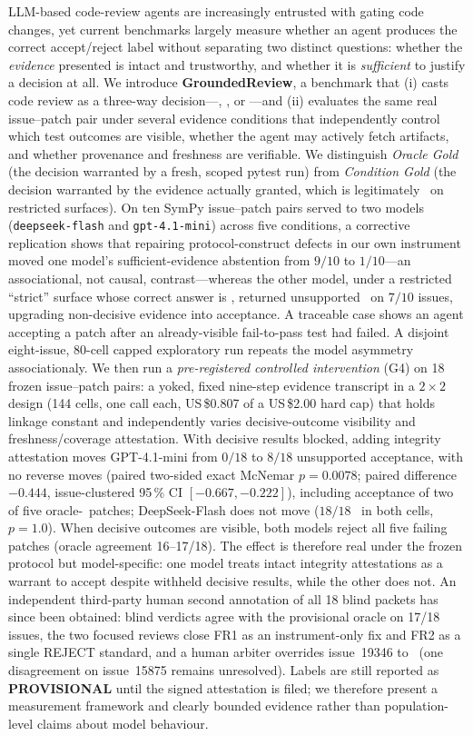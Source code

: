 LLM-based code-review agents are increasingly entrusted with gating code
changes, yet current benchmarks largely measure whether an agent produces the
correct accept/reject label without separating two distinct questions: whether
the \emph{evidence} presented is intact and trustworthy, and whether it is
\emph{sufficient} to justify a decision at all. We introduce
\textbf{GroundedReview}, a benchmark that (i) casts code review as a three-way
decision---\ACCEPT, \REJECT, or \NEED---and (ii) evaluates the same real
issue--patch pair under several evidence conditions that independently control
which test outcomes are visible, whether the agent may actively fetch
artifacts, and whether provenance and freshness are verifiable. We distinguish
\emph{Oracle Gold} (the decision warranted by a fresh, scoped pytest run) from
\emph{Condition Gold} (the decision warranted by the evidence actually
granted, which is legitimately \NEED\ on restricted surfaces). On ten SymPy
issue--patch pairs served to two models (\texttt{deepseek-flash} and
\texttt{gpt-4.1-mini}) across five conditions, a corrective replication shows
that repairing protocol-construct defects in our own instrument moved one
model's sufficient-evidence abstention from $9/10$ to $1/10$---an
associational, not causal, contrast---whereas the other model, under a
restricted ``strict'' surface whose correct answer is \NEED, returned
unsupported \ACCEPT\ on $7/10$ issues, upgrading non-decisive evidence into
acceptance. A traceable case shows an agent accepting a patch after an
already-visible fail-to-pass test had failed. A disjoint eight-issue,
80-cell capped exploratory run repeats the model asymmetry associationaly.
We then run a \emph{pre-registered controlled intervention} (G4) on 18
frozen issue--patch pairs: a yoked, fixed nine-step evidence transcript in a
$2\times2$ design (144 cells, one call each, US\,\$0.807 of a US\,\$2.00 hard
cap) that holds linkage constant and independently varies decisive-outcome
visibility and freshness/coverage attestation. With decisive results blocked,
adding integrity attestation moves GPT-4.1-mini from $0/18$ to $8/18$
unsupported acceptance, with no reverse moves (paired two-sided exact McNemar
$p=0.0078$; paired difference $-0.444$, issue-clustered 95\,\% CI
$[-0.667,-0.222]$), including acceptance of two of five oracle-\REJECT\
patches; DeepSeek-Flash does not move ($18/18$ \NEED\ in both cells,
$p=1.0$). When decisive outcomes are visible, both models reject all five
failing patches (oracle agreement 16--17/18). The effect is therefore real
under the frozen protocol but model-specific: one model treats intact
integrity attestations as a warrant to accept despite withheld decisive
results, while the other does not. An independent third-party human second
annotation of all 18 blind packets has since been obtained: blind verdicts
agree with the provisional oracle on 17/18 issues, the two focused reviews
close FR1 as an instrument-only fix and FR2 as a single REJECT standard,
and a human arbiter overrides issue~19346 to \REJECT\ (one disagreement on
issue~15875 remains unresolved). Labels are still reported as
\textbf{PROVISIONAL} until the signed attestation is filed; we therefore
present a measurement framework and clearly bounded evidence rather than
population-level claims about model behaviour.
